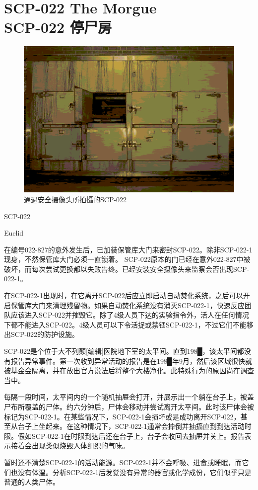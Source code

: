 \chapter[SCP-022 停尸房]{
    SCP-022 The Morgue\\
    SCP-022 停尸房
}

\label{chap:SCP-022}

\begin{figure}[H]
    \centering
    \includegraphics[width=0.5\linewidth]{images/SCP.022.png}
    \caption*{通過安全摄像头所拍攝的SCP-022}
\end{figure}

 SCP-022

 Euclid

 在编号022-827的意外发生后，已加装保管库大门来密封SCP-022。除非SCP-022-1现身，不然保管库大门必须一直锁着。 SCP-022原本的门已经在意外022-827中被破坏，而每次尝试更换都以失败告终。已经安装安全摄像头来监察会否出现SCP-022-1。

在SCP-022-1出现时，在它离开SCP-022后应立即启动自动焚化系统，之后可以开启保管库大门来清理残留物。如果自动焚化系统没有消灭SCP-022-1，快速反应团队应该进入SCP-022并摧毁它。除了4级人员下达的实验指令外，活人在任何情况下都不能进入SCP-022。4级人员可以下令活捉或禁锢SCP-022-1，不过它们不能移出SCP-022的防护设施。

 SCP-022是个位于大不列颠[编辑]医院地下室的太平间。直到198█，该太平间都没有报告异常事件。第一次收到异常活动的报告是在198█年9月，然后该区域很快就被基金会隔离，并在放出官方说法后将整个大楼净化。此特殊行为的原因尚在调查当中。

每隔一段时间，太平间内的一个随机抽屉会打开，并展示出一个躺在台子上，被盖尸布所覆盖的尸体。约六分钟后，尸体会移动并尝试离开太平间。此时该尸体会被标记为SCP-022-1。在某些情况下，SCP-022-1会损坏或是成功离开SCP-022，甚至从台子上坐起来。在这种情况下，SCP-022-1通常会摔倒并抽搐直到到达活动时限。假如SCP-022-1在时限到达后还在台子上，台子会收回去抽屉并关上。报告表示接着会出现类似烧毁人体组织的气味。

暂时还不清楚SCP-022-1的活动能源。SCP-022-1并不会呼吸、进食或睡眠，而它们也没有体温。分析SCP-022-1后发觉没有异常的器官或化学成份，它们似乎只是普通的人类尸体。

